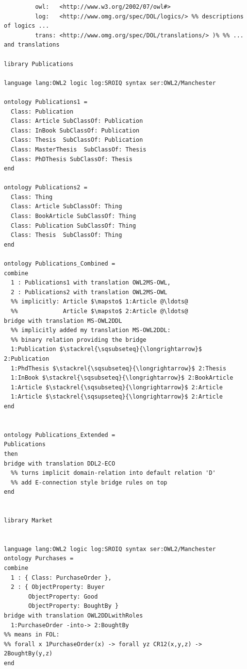 \documentclass[10pt,fleqn,%
\ifpretendfinal
final%
\else
draft%
\fi,
]{scrreprt}
\begin{document}
\begin{lstlisting}[basicstyle=\ttfamily,language=dolText,morekeywords={props,ObjectProperty,Class,DisjointUnionOf,SubClassOf,Characteristics,Transitive,Asymmetric,SubPropertyOf,DisjointClasses,EquivalentTo,inverse,only,forall,iff,if,or,exists,bridge,distributed},escapechar=@,mathescape]
%prefix( :     <http://www.example.org/mereology#>
         owl:   <http://www.w3.org/2002/07/owl#>
         log:   <http://www.omg.org/spec/DOL/logics/> %% descriptions of logics ...
         trans: <http://www.omg.org/spec/DOL/translations/> )% %% ... and translations

library Publications

language lang:OWL2 logic log:SROIQ syntax ser:OWL2/Manchester

ontology Publications1 =
  Class: Publication
  Class: Article SubClassOf: Publication
  Class: InBook SubClassOf: Publication
  Class: Thesis  SubClassOf: Publication
  Class: MasterThesis  SubClassOf: Thesis
  Class: PhDThesis SubClassOf: Thesis
end

ontology Publications2 =
  Class: Thing
  Class: Article SubClassOf: Thing
  Class: BookArticle SubClassOf: Thing
  Class: Publication SubClassOf: Thing
  Class: Thesis  SubClassOf: Thing
end

ontology Publications_Combined =
combine
  1 : Publications1 with translation OWL2MS-OWL,
  2 : Publications2 with translation OWL2MS-OWL
  %% implicitly: Article $\mapsto$ 1:Article @\ldots@
  %%             Article $\mapsto$ 2:Article @\ldots@  
bridge with translation MS-OWL2DDL
  %% implicitly added my translation MS-OWL2DDL: 
  %% binary relation providing the bridge
  1:Publication $\stackrel{\sqsubseteq}{\longrightarrow}$ 2:Publication
  1:PhdThesis $\stackrel{\sqsubseteq}{\longrightarrow}$ 2:Thesis
  1:InBook $\stackrel{\sqsubseteq}{\longrightarrow}$ 2:BookArticle
  1:Article $\stackrel{\sqsubseteq}{\longrightarrow}$ 2:Article
  1:Article $\stackrel{\sqsupseteq}{\longrightarrow}$ 2:Article
end


ontology Publications_Extended =
Publications
then
bridge with translation DDL2-ECO
  %% turns implicit domain-relation into default relation 'D'
  %% add E-connection style bridge rules on top
end


library Market


language lang:OWL2 logic log:SROIQ syntax ser:OWL2/Manchester
ontology Purchases =
combine
  1 : { Class: PurchaseOrder },
  2 : { ObjectProperty: Buyer
       ObjectProperty: Good
       ObjectProperty: BoughtBy }
bridge with translation OWL2DDLwithRoles
  1:PurchaseOrder -into-> 2:BoughtBy
%% means in FOL: 
%% forall x 1PurchaseOrder(x) -> forall yz CR12(x,y,z) -> 2BoughtBy(y,z)
end


\end{lstlisting}
\end{document}
